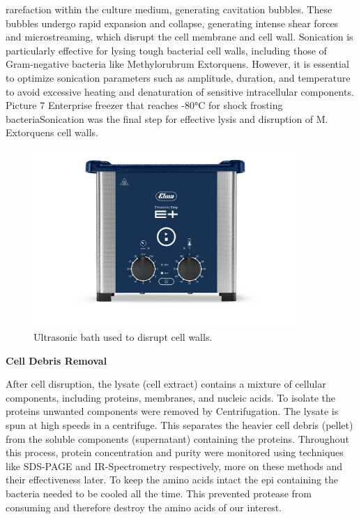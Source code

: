\begin{itemize}
    rarefaction within the culture medium, generating cavitation bubbles. These bubbles
    undergo rapid expansion and collapse, generating intense shear forces and
    microstreaming, which disrupt the cell membrane and cell wall.
    Sonication is particularly effective for lysing tough bacterial cell walls, including those
    of Gram-negative bacteria like Methylorubrum Extorquens. However, it is essential to
    optimize sonication parameters such as amplitude, duration, and temperature to
    avoid excessive heating and denaturation of sensitive intracellular components.
    Picture 7 Enterprise freezer that reaches -80°C for shock frosting bacteriaSonication was the final step for effective lysis and disruption of M. Extorquens cell
    walls.
    \begin{figure}[H]
        \centering
        \includegraphics[width=0.9\textwidth]{./media/images/ultrasonic_bath}
        \caption{Ultrasonic bath used to disrupt cell walls.}
        \label{fig:ultrasonic_bath}
    \end{figure}
\end{itemize}

\textbf{Cell Debris Removal}

After cell disruption, the lysate (cell extract) contains a mixture of cellular components,
including proteins, membranes, and nucleic acids. To isolate the proteins unwanted
components were removed by Centrifugation. The lysate is spun at high speeds in a
centrifuge. This separates the heavier cell debris (pellet) from the soluble components
(supernatant) containing the proteins.
Throughout this process, protein concentration and purity were monitored using techniques
like SDS-PAGE and IR-Spectrometry respectively, more on these methods and their
effectiveness later. To keep the amino acids intact the epi containing the bacteria needed to
be cooled all the time. This prevented protease from consuming and therefore destroy the
amino acids of our interest.

